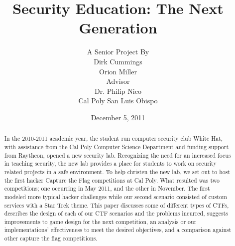 \documentclass[10pt]{article}
\begin{document}
\title{\vfill Security Education: The Next Generation}
\author{
 A Senior Project By \vspace{10pt} \\
 Dirk Cummings \\
 Orion Miller \vspace{10pt} \\
 Advisor \vspace{10pt} \\
 Dr. Philip Nico \\
 Cal Poly San Luis Obispo \vspace{10pt} \\ 
}
\date{December 5, 2011}

\maketitle

\vfill
\begin{abstract}
In the 2010-2011 academic year, the student run computer security club White
Hat, with assistance from the Cal Poly Computer Science Department and funding
support from Raytheon, opened a new security lab. Recognizing the need for an
increased focus in teaching security, the new lab provides a place for students
to work on security related projects in a safe environment. To help christen the
new lab, we set out to host the first hacker Capture the Flag competitions at
Cal Poly. What resulted was two competitions; one occurring in May 2011, and the
other in November. The first modeled more typical hacker challenges while our
second scenario consisted of custom services with a Star Trek theme.
This paper discusses some of different types of CTFs, describes the design of
each of our CTF scenarios and the problems incurred, suggests improvements to
game design for the next competition, an analysis or our implementations'
effectiveness to meet the desired objectives, and a comparison against other
capture the flag competitions.
\end{abstract}

\thispagestyle{empty} %

\newpage

\thispagestyle{empty}  %
\tableofcontents

\newpage
\setcounter{page}{1}
\end{document}
